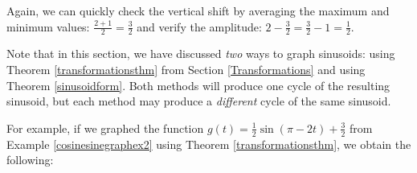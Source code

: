 \documentclass{ximera}
\begin{document}
\begin{example}
\begin{explanation}
\begin{enumerate}
\begin{image}

\end{image}

Again, we can quickly check the vertical shift by averaging the maximum and minimum values:  $\frac{2+1}{2} = \frac{3}{2}$ and verify the amplitude:  $2 - \frac{3}{2} = \frac{3}{2} - 1 = \frac{1}{2}$. 

\end{enumerate}


\end{explanation}
\end{example}

\label{phaseshiftissue} 

Note that in this section, we have discussed \textit{two} ways to graph sinusoids:  using Theorem \ref{transformationsthm} from  Section \ref{Transformations}  and using Theorem \ref{sinusoidform}.  Both methods will produce one cycle of the resulting sinusoid, but each method may produce a \textit{different} cycle of the same sinusoid.  



For example, if  we graphed the function  $g(t) = \frac{1}{2} \sin(\pi - 2t) + \frac{3}{2}$ from Example \ref{cosinesinegraphex2} using Theorem \ref{transformationsthm}, we  obtain the following:
\end{document}
